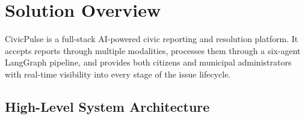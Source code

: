 \documentclass[11pt,a4paper]{article}
\begin{document}
\clearpage

\section{Solution Overview}
\label{sec:solution}

CivicPulse is a full-stack AI-powered civic reporting and resolution platform. It accepts reports through multiple modalities, processes them through a six-agent LangGraph pipeline, and provides both citizens and municipal administrators with real-time visibility into every stage of the issue lifecycle.

\subsection{High-Level System Architecture}
\end{document}
